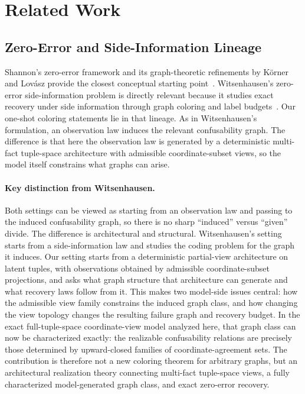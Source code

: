 \section{Related Work}\label{sec:related}

\subsection{Zero-Error and Side-Information Lineage}\label{sec:related-source-coding}

Shannon's zero-error framework and its graph-theoretic refinements by Körner and Lovász provide the closest conceptual starting point~\cite{shannon1956zero,korner1973graphs,lovasz1979shannon}. Witsenhausen's zero-error side-information problem is directly relevant because it studies exact recovery under side information through graph coloring and label budgets~\cite{witsenhausen1976zero}. Our one-shot coloring statements lie in that lineage. As in Witsenhausen's formulation, an observation law induces the relevant confusability graph. The difference is that here the observation law is generated by a deterministic multi-fact tuple-space architecture with admissible coordinate-subset views, so the model itself constrains what graphs can arise.

\paragraph{Key distinction from Witsenhausen.}
Both settings can be viewed as starting from an observation law and passing to the induced confusability graph, so there is no sharp ``induced'' versus ``given'' divide. The difference is architectural and structural. Witsenhausen's setting starts from a side-information law and studies the coding problem for the graph it induces. Our setting starts from a deterministic partial-view architecture on latent tuples, with observations obtained by admissible coordinate-subset projections, and asks what graph structure that architecture can generate and what recovery laws follow from it. This makes two model-side issues central: how the admissible view family constrains the induced graph class, and how changing the view topology changes the resulting failure graph and recovery budget. In the exact full-tuple-space coordinate-view model analyzed here, that graph class can now be characterized exactly: the realizable confusability relations are precisely those determined by upward-closed families of coordinate-agreement sets. The contribution is therefore not a new coloring theorem for arbitrary graphs, but an architectural realization theory connecting multi-fact tuple-space views, a fully characterized model-generated graph class, and exact zero-error recovery.

